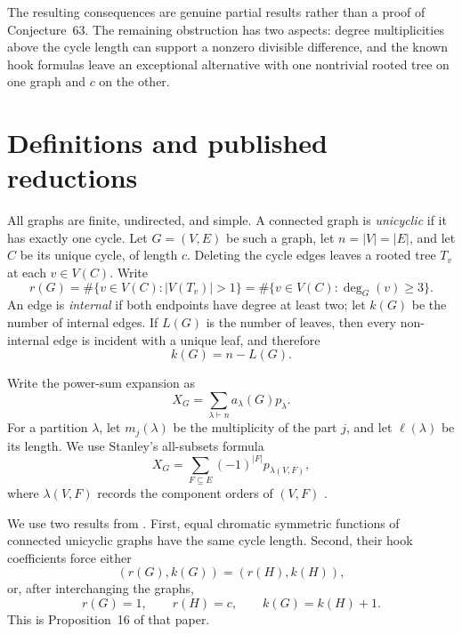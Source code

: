 \documentclass[11pt]{amsart}
\theoremstyle{definition}
\newcommand{\CSF}{X}
\newcommand{\cycle}{C}
\begin{document}
The resulting consequences are genuine partial results rather than a proof
of Conjecture~63.  The remaining obstruction has two aspects: degree
multiplicities above the cycle length can support a nonzero divisible
difference, and the known hook formulas leave an exceptional alternative
with one nontrivial rooted tree on one graph and \(c\) on the other.

\section{Definitions and published reductions}

All graphs are finite, undirected, and simple.  A connected graph is
\emph{unicyclic} if it has exactly one cycle.  Let \(G=(V,E)\) be such a
graph, let \(n=|V|=|E|\), and let \(\cycle\) be its unique cycle, of length
\(c\).  Deleting the cycle edges leaves a rooted tree \(T_v\) at each
\(v\in V(\cycle)\).  Write
\[
r(G)=\#\{v\in V(\cycle): |V(T_v)|>1\}
    =\#\{v\in V(\cycle):\deg_G(v)\geq3\}.
\]
An edge is \emph{internal} if both endpoints have degree at least two; let
\(k(G)\) be the number of internal edges.  If \(L(G)\) is the number of
leaves, then every non-internal edge is incident with a unique leaf, and
therefore
\begin{equation}\label{eq:k-leaves}
k(G)=n-L(G).
\end{equation}

Write the power-sum expansion as
\[
\CSF_G=\sum_{\lambda\vdash n}a_\lambda(G)p_\lambda.
\]
For a partition \(\lambda\), let \(m_j(\lambda)\) be the multiplicity of
the part \(j\), and let \(\ell(\lambda)\) be its length.  We use Stanley's
all-subsets formula
\begin{equation}\label{eq:stanley}
\CSF_G=\sum_{F\subseteq E}(-1)^{|F|}p_{\lambda(V,F)},
\end{equation}
where \(\lambda(V,F)\) records the component orders of \((V,F)\)
\cite[Theorem~2.5]{Stanley1995}.

We use two results from \cite{BinghamEtAl2026}.  First, equal chromatic
symmetric functions of connected unicyclic graphs have the same cycle length.
Second, their hook coefficients force either
\begin{equation}\label{eq:hookordinary}
(r(G),k(G))=(r(H),k(H)),
\end{equation}
or, after interchanging the graphs,
\begin{equation}\label{eq:hookexceptional}
r(G)=1,\qquad r(H)=c,\qquad k(G)=k(H)+1.
\end{equation}
This is Proposition~16 of that paper.
\end{document}
